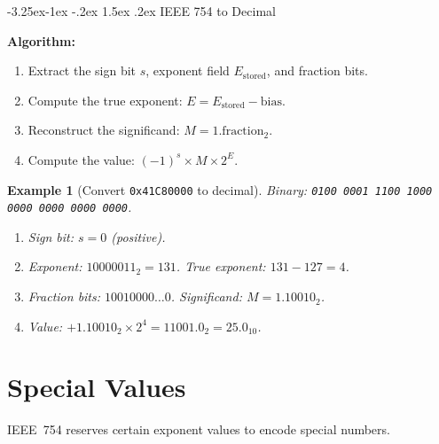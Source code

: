 \documentclass{article}
\makeatletter
\newtheorem{example}{Example}[section]
\theoremstyle{remark}
\newlength{\subsecindent}
\renewcommand\subsection{\@startsection{subsection}{2}{\subsecindent}%
  {-3.25ex\@plus -1ex \@minus -.2ex}%
  {1.5ex \@plus .2ex}%
  {\normalfont\large\bfseries}}
\newenvironment{sub}{%
  \begin{list}{}{%
    \setlength{\leftmargin}{4em}%
    \setlength{\rightmargin}{0pt}%
    \setlength{\topsep}{0pt}%
    \setlength{\partopsep}{0pt}%
    \setlength{\parsep}{\parskip}%
    \setlength{\itemsep}{\parskip}%
  }\item\relax
}{\end{list}}
\newenvironment{secbody}{%
  \begin{list}{}{%
    \setlength{\leftmargin}{\subsecindent}%
    \setlength{\rightmargin}{0pt}%
    \setlength{\topsep}{0pt}%
    \setlength{\partopsep}{0pt}%
    \setlength{\parsep}{\parskip}%
    \setlength{\itemsep}{\parskip}%
  }\item\relax
}{\end{list}}
\makeatother
\begin{document}
\subsection{IEEE 754 to Decimal}
\begin{sub}
\textbf{Algorithm:}
\begin{enumerate}
  \item Extract the sign bit $s$, exponent field $E_{\text{stored}}$, and
        fraction bits.
  \item Compute the true exponent: $E = E_{\text{stored}} - \text{bias}$.
  \item Reconstruct the significand: $M = 1.\text{fraction}_2$.
  \item Compute the value: $(-1)^s \times M \times 2^E$.
\end{enumerate}

\begin{example}[Convert \texttt{0x41C80000} to decimal]
Binary: \texttt{0100\,0001\,1100\,1000\,0000\,0000\,0000\,0000}.
\begin{enumerate}
  \item Sign bit: $s = 0$ (positive).
  \item Exponent: $10000011_2 = 131$. True exponent: $131 - 127 = 4$.
  \item Fraction bits: $10010000\ldots0$.
        Significand: $M = 1.10010_2$.
  \item Value: $+1.10010_2 \times 2^{4} = 11001.0_2 = 25.0_{10}$.
\end{enumerate}
\end{example}
\end{sub}

\section{Special Values}

\begin{secbody}
IEEE~754 reserves certain exponent values to encode special numbers.
\end{secbody}
\end{document}
